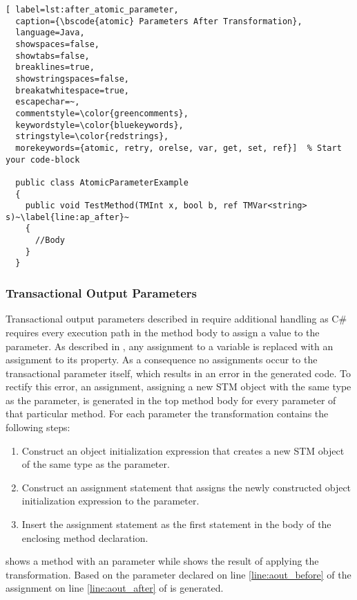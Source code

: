 \begin{lstlisting}[ label=lst:after_atomic_parameter,
  caption={\bscode{atomic} Parameters After Transformation},
  language=Java,  
  showspaces=false,
  showtabs=false,
  breaklines=true,
  showstringspaces=false,
  breakatwhitespace=true,
  escapechar=~,
  commentstyle=\color{greencomments},
  keywordstyle=\color{bluekeywords},
  stringstyle=\color{redstrings},
  morekeywords={atomic, retry, orelse, var, get, set, ref}]  % Start your code-block

  public class AtomicParameterExample
  {
    public void TestMethod(TMInt x, bool b, ref TMVar<string> s)~\label{line:ap_after}~
    {
      //Body
    }
  }
\end{lstlisting}


\subsubsection{Transactional Output Parameters}
Transactional output parameters described in  require additional handling as C\# requires every execution path in the method body to assign a value to the parameter\cite[p. 42]{sestoft2011c}. As described in , any assignment to a variable is replaced with an assignment to its  property. As a consequence no assignments occur to the transactional parameter itself, which results in an error in the generated code. To rectify this error, an assignment, assigning a new \ac{STM} object with the same type as the parameter, is generated in the top method body for every  parameter of that particular method. For each  parameter the \stmnamesp transformation contains the following steps:

\begin{enumerate}
	\item Construct an object initialization expression that creates a new \ac{STM} object of the same type as the parameter.
	\item Construct an assignment statement that assigns the newly constructed object initialization expression to the  parameter.
	\item Insert the assignment statement as the first statement in the body of the enclosing method declaration.
\end{enumerate}

 shows a method with an  parameter while  shows the result of applying the transformation.
Based on the  parameter declared on line \ref{line:aout_before} of  the assignment on line \ref{line:aout_after} of  is generated.


